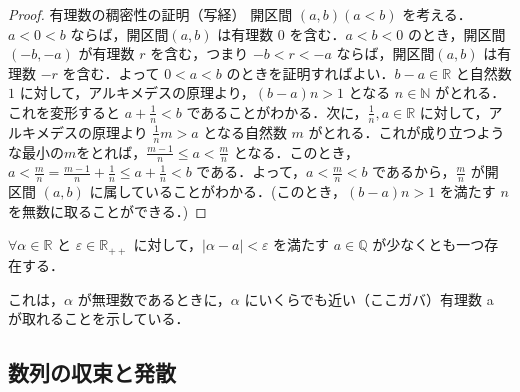 \documentclass[xelatex,ja=standard,jafont=noto]{bxjsarticle}
\begin{document}
  \begin{proof}{有理数の稠密性の証明（写経）}{}
   開区間 $(a, b) (a < b)$ を考える．$a < 0 < b$ ならば，開区間$(a, b)$ は有理数 $0$ を含む．$a < b < 0$ のとき，開区間 $(-b, -a)$ が有理数 $r$ を含む，つまり $-b < r < -a$ ならば，開区間$(a, b)$ は有理数 $-r$ を含む．よって $0 < a < b$ のときを証明すればよい．$b - a \in \mathbb{R}$ と自然数 $1$ に対して，アルキメデスの原理より，$(b - a)n > 1$ となる $n \in \mathbb{N}$ がとれる．これを変形すると $a + \frac{1}{n} < b$ であることがわかる．次に，$\frac{1}{n}, a \in \mathbb{R}$ に対して，アルキメデスの原理より $\frac{1}{n}m > a$ となる自然数 $m$ がとれる．これが成り立つような最小の$m$をとれば，$\frac{m - 1}{n} \leq a < \frac{m}{n}$ となる．このとき，$a < \frac{m}{n} = \frac{m - 1}{n} + \frac{1}{n} \leq a + \frac{1}{n} < b$ である．よって，$a < \frac{m}{n} < b$ であるから，$\frac{m}{n}$ が開区間 $(a, b)$ に属していることがわかる．(このとき，$(b-a)n > 1$ を満たす $n $を無数に取ることができる．)

  \end{proof}
   \begin{corollary}{}{}
    $\forall \alpha \in \mathbb{R}$ と $\varepsilon \in \mathbb{R}_{++}$ に対して，$|\alpha - a| < \varepsilon$ を満たす $a \in \mathbb{Q}$ が少なくとも一つ存在する．

   \end{corollary}
 これは，$\alpha$ が無理数であるときに，$\alpha$ にいくらでも近い（ここガバ）有理数 a が取れることを示している．

  \subsection{数列の収束と発散}
\end{document}

